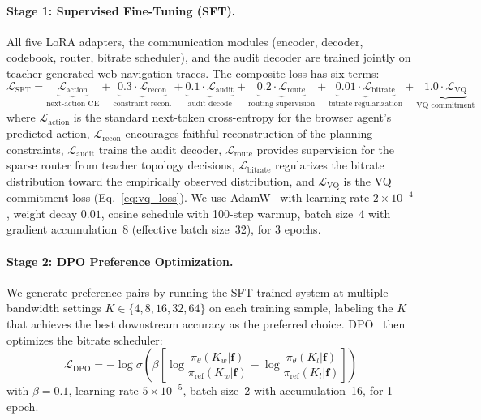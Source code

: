 \documentclass{article}
\begin{document}
\paragraph{Stage 1: Supervised Fine-Tuning (SFT).}
All five LoRA adapters, the communication modules (encoder, decoder, codebook, router, bitrate scheduler), and the audit decoder are trained jointly on teacher-generated web navigation traces.  The composite loss has six terms:
\begin{equation}
\mathcal{L}_\text{SFT} = \underbrace{\mathcal{L}_\text{action}}_{\text{next-action CE}} + \underbrace{0.3 \cdot \mathcal{L}_\text{recon}}_{\text{constraint recon.}} + \underbrace{0.1 \cdot \mathcal{L}_\text{audit}}_{\text{audit decode}} + \underbrace{0.2 \cdot \mathcal{L}_\text{route}}_{\text{routing supervision}} + \underbrace{0.01 \cdot \mathcal{L}_\text{bitrate}}_{\text{bitrate regularization}} + \underbrace{1.0 \cdot \mathcal{L}_\text{VQ}}_{\text{VQ commitment}}
\label{eq:sft_loss}
\end{equation}
where $\mathcal{L}_\text{action}$ is the standard next-token cross-entropy for the browser agent's predicted action, $\mathcal{L}_\text{recon}$ encourages faithful reconstruction of the planning constraints, $\mathcal{L}_\text{audit}$ trains the audit decoder, $\mathcal{L}_\text{route}$ provides supervision for the sparse router from teacher topology decisions, $\mathcal{L}_\text{bitrate}$ regularizes the bitrate distribution toward the empirically observed distribution, and $\mathcal{L}_\text{VQ}$ is the VQ commitment loss (Eq.~\ref{eq:vq_loss}).  We use AdamW~\cite{loshchilov2019adamw} with learning rate $2{\times}10^{-4}$, weight decay $0.01$, cosine schedule with 100-step warmup, batch size~4 with gradient accumulation~8 (effective batch size~32), for 3 epochs.

\paragraph{Stage 2: DPO Preference Optimization.}
We generate preference pairs by running the SFT-trained system at multiple bandwidth settings $K \in \{4, 8, 16, 32, 64\}$ on each training sample, labeling the $K$ that achieves the best downstream accuracy as the preferred choice.  DPO~\cite{rafailov2023dpo} then optimizes the bitrate scheduler:
\begin{equation}
\mathcal{L}_\text{DPO} = -\log\sigma\left(\beta \left[\log\frac{\pi_\theta(K_w | \mathbf{f})}{\pi_\text{ref}(K_w | \mathbf{f})} - \log\frac{\pi_\theta(K_l | \mathbf{f})}{\pi_\text{ref}(K_l | \mathbf{f})}\right]\right)
\label{eq:dpo}
\end{equation}
with $\beta{=}0.1$, learning rate $5{\times}10^{-5}$, batch size~2 with accumulation~16, for 1 epoch.
\end{document}
